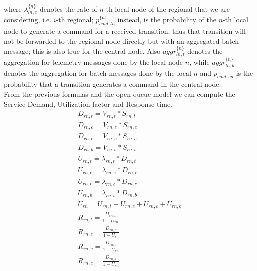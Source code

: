 \documentclass[11pt]{article}
\begin{document}
where $\lambda^{\{ n \}}_{ln, e}$ denotes the rate of $n$-th local node of the regional that we are considering, i.e. $i$-th regional; $p^{\{ n \}}_{cmd,ln}$ instead, is the probability of the $n$-th local node to generate a command for a received transition, thus that transition will not be forwarded to the regional node directly but with an aggregated batch message; this is also true for the central node. Also $aggr^{\{n\}}_{ln, t}$ denotes the aggregation for telemetry messages done by the local node $n$, while $aggr^{\{n\}}_{ln,b}$ denotes the aggregation for batch messages done by the local $n$ and $p_{cmd, cn}$ is the probability that a transition generates a command in the central node. \\
From the previous formulas and the open queue model we can compute the Service Demand, Utilization factor and Response time.
\begin{equation}
	\begin{array}{l}
		D_{rn, t} = V_{rn, t} * S_{rn, t} \\
		D_{rn, e} = V_{rn, e} * S_{rn, e} \\
		D_{rn, c} = V_{rn, c} * S_{rn, c} \\
		D_{rn, b} = V_{rn, b} * S_{rn, b} \\
		U_{rn, t} = \lambda_{rn, t} * D_{rn, t} \\
		U_{rn, e} = \lambda_{rn, e} * D_{rn, e} \\
		U_{rn, c} = \lambda_{rn, c} * D_{rn, c} \\
		U_{rn, b} = \lambda_{rn, b} * D_{rn, b} \\
		U_{rn} = U_{rn, t} + U_{rn, e} + U_{rn, c} + U_{rn, b} \\
		R_{rn, t} = \frac{D_{rn, t}}{1 - U_{rn}} \\
		R_{rn, e} = \frac{D_{rn, e}}{1 - U_{rn}} \\
		R_{rn, c} = \frac{D_{rn, c}}{1 - U_{rn}} \\
		R_{rn, c} = \frac{D_{rn, b}}{1 - U_{rn}} \\
	\end{array}
\end{equation}
\end{document}
